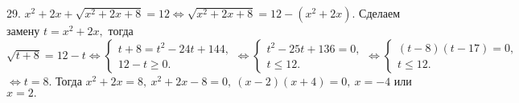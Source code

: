 29. $x^2+2x+\sqrt{x^2+2x+8}=12\Leftrightarrow\sqrt{x^2+2x+8}=12-(x^2+2x).$ Сделаем замену $t=x^2+2x,$ тогда $\sqrt{t+8}=12-t\Leftrightarrow
\begin{cases}t+8=t^2-24t+144,\\ 12-t\geqslant0.\end{cases}\Leftrightarrow
\begin{cases}t^2-25t+136=0,\\ t\leqslant12.\end{cases}\Leftrightarrow
\begin{cases}(t-8)(t-17)=0,\\ t\leqslant12.\end{cases}$\\$\Leftrightarrow t=8.$ Тогда $x^2+2x=8,\ x^2+2x-8=0,\ (x-2)(x+4)=0,\ x=-4$ или $x=2.$\\
